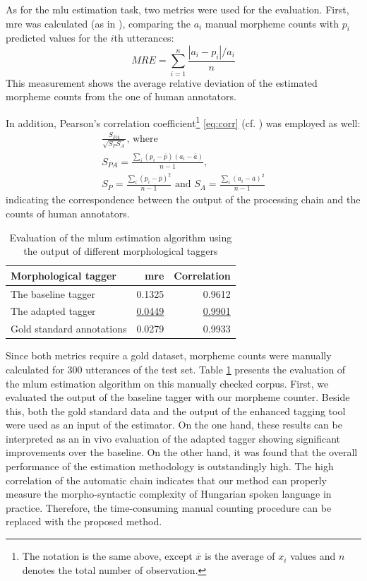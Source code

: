 As for the \acrshort{mlu} estimation task, two metrics were used for the evaluation. 
First, \acrlong{mre} was calculated (as in \cite{Witten2011}), comparing the $a_i$ manual morpheme counts with $p_i$ predicted values for the $i$th utterances:
\begin{equation}
MRE = \sum_{i=1}^n \frac{|a_i-p_i|/a_i}{n}
\end{equation}
This measurement shows the average relative deviation of the estimated morpheme counts from the one of human annotators. 

In addition, Pearson's correlation coefficient\footnote{The notation is the same above, except $\overline{x}$ is the average of $x_i$ values and $n$ denotes the total number of observation.}
 \eqref{eq:corr} (cf. \cite{Witten2011}) was employed as well:
  \begin{gather}\label{eq:corr}
  \frac{S_{PA}}{\sqrt{S_P S_A}} \text{, where } \\
  S_{PA} = \frac{\sum_i{(p_i-\overline{p})(a_i-\overline{a})}}{n-1} \text{, } \nonumber \\
  S_{P} = \frac{\sum_i{(p_i-\overline{p})^2}}{n-1} \text{ and } S_{A} = \frac{\sum_i{(a_i-\overline{a})^2}}{n-1}  \nonumber
  \end{gather}
  indicating the correspondence between the output of the processing chain and the counts of human annotators.


\begin{table}[H]
\centering
\caption{Evaluation of the  \acrshort{mlum} estimation algorithm using the output of  different morphological taggers}
\label{tab:eval_est}
\begin{tabular}{ l r r} 
\hline
Morphological tagger & \acrshort{mre} & Correlation \\
\hline
The baseline tagger &  0.1325  &  0.9612 \\
The adapted tagger & \underline{0.0449} & \underline{0.9901} \\
Gold standard annotations &  0.0279 &  0.9933 \\
\hline
\end{tabular}
\end{table}

Since both metrics require a gold dataset, morpheme counts were manually calculated for 300 utterances of the test set.
Table \ref{tab:eval_est} presents the evaluation of the \acrshort{mlum} estimation algorithm on this manually checked corpus. 
First, we evaluated the output of the baseline tagger with our morpheme counter. 
Beside this, both the gold standard data and the output of the enhanced tagging tool were used as an input of the estimator. %
On the one hand, these results can be interpreted as an in vivo evaluation of the adapted tagger showing significant improvements over the baseline.
On the other hand, it was found that the overall performance of the estimation methodology is outstandingly high.  
The high correlation of the automatic chain indicates that our method can properly measure the morpho-syntactic complexity of Hungarian spoken language in practice. 
Therefore, the time-consuming manual counting procedure can be replaced with the proposed method.